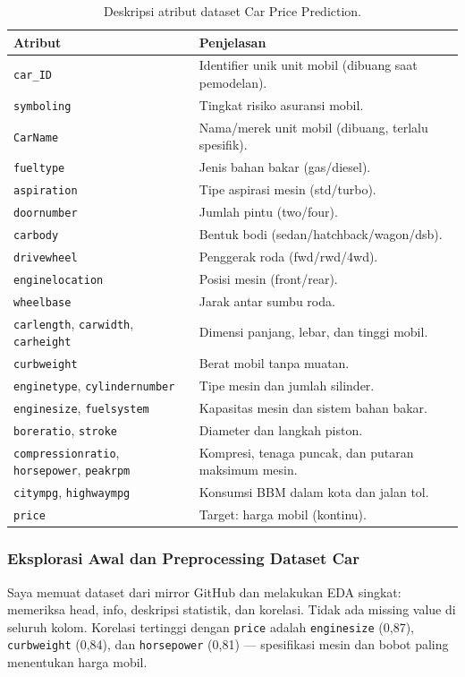 \documentclass[a4paper,oneside,12pt]{report}
\begin{document}
\begin{table}[H]
\centering
\small
\begin{tabular}{|p{5.5cm}|p{7.5cm}|}
\hline
\textbf{Atribut} & \textbf{Penjelasan} \\
\hline
\texttt{car\_ID} & Identifier unik unit mobil (dibuang saat pemodelan). \\
\texttt{symboling} & Tingkat risiko asuransi mobil. \\
\texttt{CarName} & Nama/merek unit mobil (dibuang, terlalu spesifik). \\
\texttt{fueltype} & Jenis bahan bakar (gas/diesel). \\
\texttt{aspiration} & Tipe aspirasi mesin (std/turbo). \\
\texttt{doornumber} & Jumlah pintu (two/four). \\
\texttt{carbody} & Bentuk bodi (sedan/hatchback/wagon/dsb). \\
\texttt{drivewheel} & Penggerak roda (fwd/rwd/4wd). \\
\texttt{enginelocation} & Posisi mesin (front/rear). \\
\texttt{wheelbase} & Jarak antar sumbu roda. \\
\texttt{carlength}, \texttt{carwidth}, \texttt{carheight} & Dimensi panjang, lebar, dan tinggi mobil. \\
\texttt{curbweight} & Berat mobil tanpa muatan. \\
\texttt{enginetype}, \texttt{cylindernumber} & Tipe mesin dan jumlah silinder. \\
\texttt{enginesize}, \texttt{fuelsystem} & Kapasitas mesin dan sistem bahan bakar. \\
\texttt{boreratio}, \texttt{stroke} & Diameter dan langkah piston. \\
\texttt{compressionratio}, \texttt{horsepower}, \texttt{peakrpm} & Kompresi, tenaga puncak, dan putaran maksimum mesin. \\
\texttt{citympg}, \texttt{highwaympg} & Konsumsi BBM dalam kota dan jalan tol. \\
\texttt{price} & Target: harga mobil (kontinu). \\
\hline
\end{tabular}
\caption{Deskripsi atribut dataset Car Price Prediction.}
\label{tab:car-attributes}
\end{table}

\subsubsection{Eksplorasi Awal dan Preprocessing Dataset Car}
Saya memuat dataset dari mirror GitHub dan melakukan EDA singkat: memeriksa head, info, deskripsi statistik, dan korelasi. Tidak ada missing value di seluruh kolom. Korelasi tertinggi dengan \texttt{price} adalah \texttt{enginesize} (0,87), \texttt{curbweight} (0,84), dan \texttt{horsepower} (0,81) --- spesifikasi mesin dan bobot paling menentukan harga mobil.
\end{document}
